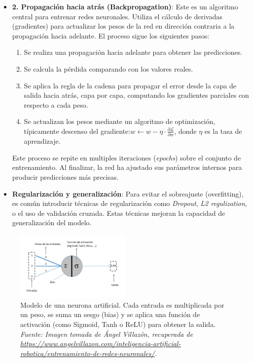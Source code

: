\documentclass[11pt]{article} %
\begin{document}
\begin{itemize}
\item\textbf{2. Propagación hacia atrás (Backpropagation)}:\newline
Este es un algoritmo central para entrenar redes neuronales. Utiliza el cálculo de derivadas (gradientes) para actualizar los pesos de la red en dirección contraria a la propagación hacia adelante. El proceso sigue los siguientes pasos:
\begin{enumerate}
    \item Se realiza una propagación hacia adelante para obtener las predicciones.
    \item Se calcula la pérdida comparando con los valores reales.
    \item Se aplica la regla de la cadena para propagar el error desde la capa de salida hacia atrás, capa por capa, computando los gradientes parciales con respecto a cada peso.
    \item Se actualizan los pesos mediante un algoritmo de optimización, típicamente descenso del gradiente:$w \leftarrow w - \eta \cdot \frac{\partial \mathcal{L}}{\partial w}$, donde $\eta$ es la tasa de aprendizaje.
\end{enumerate}
Este proceso se repite en multiples iteraciones (\textit{epochs}) sobre el conjunto de entrenamiento. Al finalizar, la red ha ajustado sus parámetros internos para producir predicciones más precisas.

\item \textbf{Regularización y generalización}: \newline
Para evitar el sobreajuste (overfitting), es común introducir técnicas de regularización como \textit{Dropout}, \textit{L2 regulization}, o el uso de validación cruzada. Estas técnicas mejoran la capacidad de generalización del modelo.
\end{itemize}
\begin{figure}[H]
    \centering
    \includegraphics[width=0.5\textwidth]{Images/111-1.jpg}
    \caption{Modelo de una neurona artificial. Cada entrada es multiplicada por un peso, se suma un sesgo (bias) y se aplica una función de activación (como Sigmoid, Tanh o ReLU) para obtener la salida. \textit{Fuente: Imagen tomada de Ángel Villazón, recuperada de \url{https://www.angelvillazon.com/inteligencia-artificial-robotica/entrenamiento-de-redes-neuronales/}.}}
    \label{fig:neurona-artificial}
\end{figure}
\end{document}
